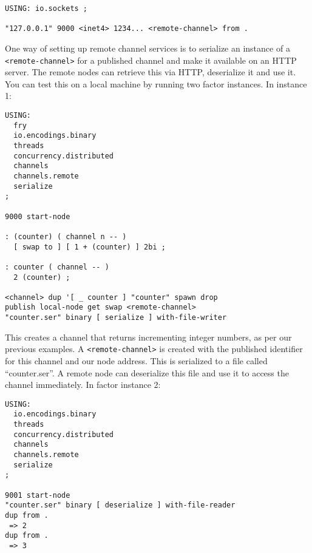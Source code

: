\begin{verbatim}
USING: io.sockets ;

"127.0.0.1" 9000 <inet4> 1234... <remote-channel> from .
\end{verbatim}

One way of setting up remote channel services is to serialize an instance of a \texttt{<remote-channel>} for a published channel and make it available on an HTTP server. The remote nodes can retrieve this via HTTP, deserialize it and use it. You can test this on a local machine by running two factor instances. In instance 1:

\begin{verbatim}
USING:
  fry 
  io.encodings.binary
  threads 
  concurrency.distributed 
  channels  
  channels.remote 
  serialize 
;

9000 start-node 

: (counter) ( channel n -- )
  [ swap to ] [ 1 + (counter) ] 2bi ;
    
: counter ( channel -- )
  2 (counter) ;    

<channel> dup '[ _ counter ] "counter" spawn drop 
publish local-node get swap <remote-channel>
"counter.ser" binary [ serialize ] with-file-writer
\end{verbatim}

This creates a channel that returns incrementing integer numbers, as per our previous examples. A \texttt{<remote-channel>} is created with the published identifier for this channel and our node address. This is serialized to a file called ``counter.ser''. A remote node can deserialize this file and use it to access the channel immediately. In factor instance 2:

\begin{verbatim}
USING: 
  io.encodings.binary
  threads 
  concurrency.distributed 
  channels 
  channels.remote 
  serialize 
;

9001 start-node 
"counter.ser" binary [ deserialize ] with-file-reader
dup from .
 => 2
dup from .
 => 3
\end{verbatim}
